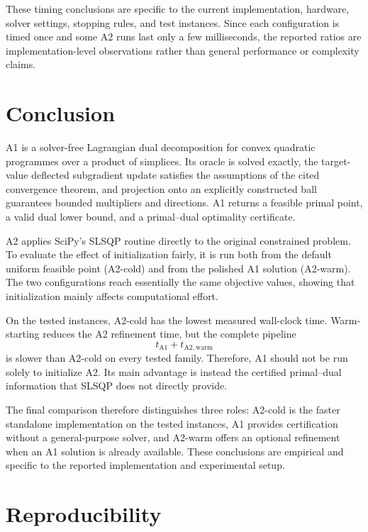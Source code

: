 \documentclass[12pt]{article}
\begin{document}
These timing conclusions are specific to the current implementation,
hardware, solver settings, stopping rules, and test instances. Since
each configuration is timed once and some A2 runs last only a few
milliseconds, the reported ratios are implementation-level
observations rather than general performance or complexity claims.

\section{Conclusion}

A1 is a solver-free Lagrangian dual decomposition for convex quadratic
programmes over a product of simplices. Its oracle is solved exactly,
the target-value deflected subgradient update satisfies the assumptions
of the cited convergence theorem, and projection onto an explicitly
constructed ball guarantees bounded multipliers and directions. A1
returns a feasible primal point, a valid dual lower bound, and a
primal--dual optimality certificate.

A2 applies SciPy's SLSQP routine directly to the original constrained
problem. To evaluate the effect of initialization fairly, it is run
both from the default uniform feasible point (A2-cold) and from the
polished A1 solution (A2-warm). The two configurations reach
essentially the same objective values, showing that initialization
mainly affects computational effort.

On the tested instances, A2-cold has the lowest measured wall-clock
time. Warm-starting reduces the A2 refinement time, but the complete
pipeline
\[
t_{\mathrm{A1}}+t_{\mathrm{A2,warm}}
\]
is slower than A2-cold on every tested family. Therefore, A1 should not
be run solely to initialize A2. Its main advantage is instead the
certified primal--dual information that SLSQP does not directly
provide.

The final comparison therefore distinguishes three roles: A2-cold is
the faster standalone implementation on the tested instances, A1
provides certification without a general-purpose solver, and A2-warm
offers an optional refinement when an A1 solution is already
available. These conclusions are empirical and specific to the
reported implementation and experimental setup.

\appendix

\section{Reproducibility}
\end{document}
